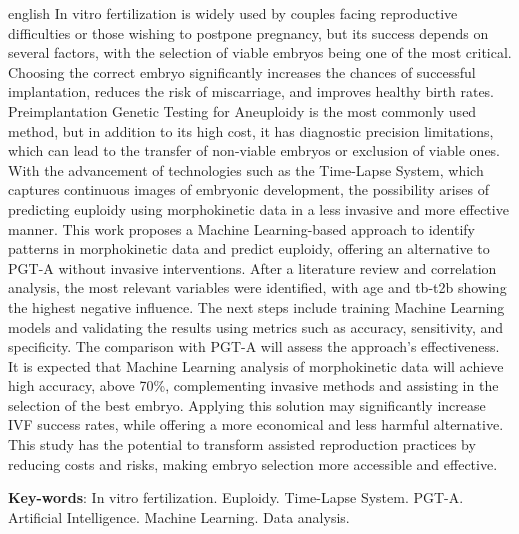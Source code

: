 \begin{resumo}[Abstract]
 \begin{otherlanguage*}{english}
    In vitro fertilization is widely used by couples facing reproductive difficulties or those wishing to postpone pregnancy, but its success depends on several factors, with the selection of viable embryos being one of the most critical. Choosing the correct embryo significantly increases the chances of successful implantation, reduces the risk of miscarriage, and improves healthy birth rates. Preimplantation Genetic Testing for Aneuploidy is the most commonly used method, but in addition to its high cost, it has diagnostic precision limitations, which can lead to the transfer of non-viable embryos or exclusion of viable ones. With the advancement of technologies such as the Time-Lapse System, which captures continuous images of embryonic development, the possibility arises of predicting euploidy using morphokinetic data in a less invasive and more effective manner. This work proposes a Machine Learning-based approach to identify patterns in morphokinetic data and predict euploidy, offering an alternative to PGT-A without invasive interventions. After a literature review and correlation analysis, the most relevant variables were identified, with age and tb-t2b showing the highest negative influence. The next steps include training Machine Learning models and validating the results using metrics such as accuracy, sensitivity, and specificity. The comparison with PGT-A will assess the approach’s effectiveness. It is expected that Machine Learning analysis of morphokinetic data will achieve high accuracy, above 70\%, complementing invasive methods and assisting in the selection of the best embryo. Applying this solution may significantly increase IVF success rates, while offering a more economical and less harmful alternative. This study has the potential to transform assisted reproduction practices by reducing costs and risks, making embryo selection more accessible and effective.

  \vspace{\onelineskip}
 
  \noindent 
  \textbf{Key-words}: In vitro fertilization. Euploidy. Time-Lapse System. PGT-A. Artificial Intelligence. Machine Learning. Data analysis.
 \end{otherlanguage*}
\end{resumo}
